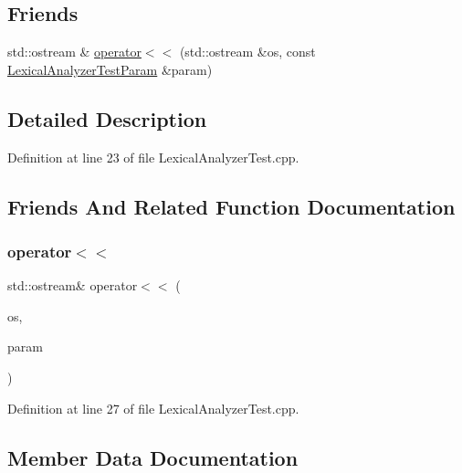 \subsection*{Friends}
\begin{DoxyCompactItemize}
\item 
std\+::ostream \& \hyperlink{struct_lexical_analyzer_test_param_aa38aef7ff266774e9140f334adee7200}{operator$<$$<$} (std\+::ostream \&os, const \hyperlink{struct_lexical_analyzer_test_param}{Lexical\+Analyzer\+Test\+Param} \&param)
\end{DoxyCompactItemize}


\subsection{Detailed Description}


Definition at line 23 of file Lexical\+Analyzer\+Test.\+cpp.



\subsection{Friends And Related Function Documentation}
\mbox{\label{struct_lexical_analyzer_test_param_aa38aef7ff266774e9140f334adee7200}} 
\subsubsection{\texorpdfstring{operator$<$$<$}{operator<<}}
{\footnotesize\ttfamily std\+::ostream\& operator$<$$<$ (\begin{DoxyParamCaption}\item[{std\+::ostream \&}]{os,  }\item[{const \hyperlink{struct_lexical_analyzer_test_param}{Lexical\+Analyzer\+Test\+Param} \&}]{param }\end{DoxyParamCaption})\hspace{0.3cm}{\ttfamily [friend]}}



Definition at line 27 of file Lexical\+Analyzer\+Test.\+cpp.



\subsection{Member Data Documentation}
\mbox{\label{struct_lexical_analyzer_test_param_abc163995865fa8efa68a0a4dd53d77ef}} 
